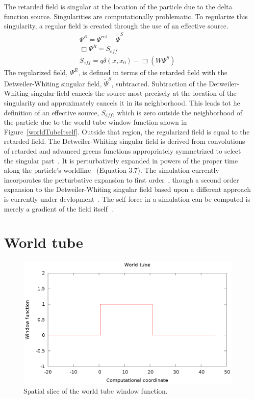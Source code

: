 The retarded field is singular at the location of the particle due to the delta function source. Singularities are computationally problematic. To regularize this singularity, a regular field is created through the use of an effective source.
\begin{eqnarray}
\Psi^R=\Psi^{ret}-\tilde{\Psi}^S\\
\Box\Psi^R=S_{eff}\\
S_{eff}=q\delta(x,x_0)-\Box(W\Psi^S)
\end{eqnarray}
The regularized field, $\Psi^R$, is defined in terms of the retarded field with the Detweiler-Whiting singular field, $\tilde{\Psi}^S$, subtracted. Subtraction of the Detweiler-Whiting singular field cancels the source most precisely at the location of the singularity and approximately cancels it in its neighborhood. This leads tot he definition of an effective source, $S_{eff}$, which is zero outside the neighborhood of the particle due to the world tube window function shown in Figure~\ref{worldTubeItself}. Outside that region, the regularized field is equal to the retarded field. The Detweiler-Whiting singular field is derived from convolutions of retarded and advanced greens functions appropriately symmetrized to select the singular part~\cite{detweiler_whiting}. It is perturbatively expanded in powers of the proper time along the particle's worldline~\cite{heffernan_ottewil_wardell} (Equation 3.7). The simulation currently incorporates the perturbative expansion to first order~\cite{heffernan_ottewil_wardell}, though a second order expansion to the Detweiler-Whiting singular field based upon a different approach is currently under devlopment~\cite{pound2ndOrderSelfForce}. The self-force in a simulation can be computed is merely a gradient of the field itself~\cite{vega_wardell_diener_eff_source}. 


\section{World tube}
\begin{figure}
\includegraphics{worldTubeItself}
\caption{Spatial slice of the world tube window function.}
\label{wtwindow}
\end{figure}

